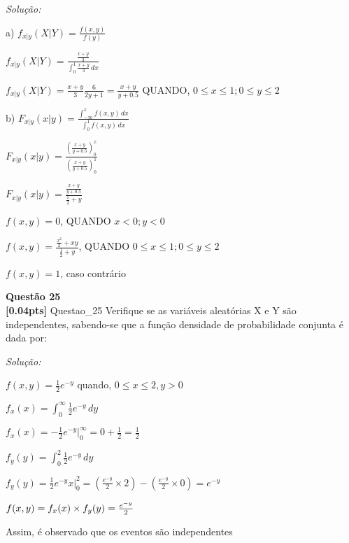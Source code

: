 \documentclass{article}
\newenvironment{problem}[2][Questão]
    { \begin{mdframed}[backgroundcolor=gray!20] \textbf{#1 #2} \\}
    {  \end{mdframed}}
\newenvironment{solution}
    {\textit{Solução:}}
    {}
\begin{document}
\begin{solution}

a) $f_{x|y}(X|Y) = \frac{f(x,y)}{f(y)}$

$f_{x|y}(X|Y) = \frac{\frac{x+y}{3}}{\int_{0}^{1}\frac{x+y}{3} \,dx}$

$f_{x|y}(X|Y) = \frac{x+y}{3} \frac{6}{2y+1} = \frac{x+y}{y+0.5}$ QUANDO, $0 \leq x \leq 1 ; 0 \leq y \leq 2$

b) $F_{x|y}(x|y) = \frac{\int_{-\infty}^{x}f(x,y) \, dx}{\int_{0}^{1} f(x,y) \, dx}$

$F_{x|y}(x|y) = \frac{(\frac{x+y}{y+0.5})_{0}^{x}}{(\frac{x+y}{y+0.5})_{0}^{1}} $

$F_{x|y}(x|y) = \frac{\frac{x+y}{y+0.5}}{\frac{1}{2}+y}$

$f(x,y) = 0 $, QUANDO $x<0;y<0$

$f(x,y) = \frac{\frac{x^{2}}{2}+xy}{\frac{1}{2}+y} 
$, QUANDO $0 \leq x \leq 1; 0 \leq y \leq 2$

$f(x,y) = 1 $, caso contrário

\end{solution}

\begin{problem}{25}
\textbf{[0.04pts]} Questao\_25 Verifique se as variáveis aleatórias X e Y são independentes, sabendo-se que a função densidade de probabilidade conjunta é dada por: 

\end{problem}

\begin{solution}

$f(x,y) = \frac{1}{2} e^{-y}$ quando, $0 \leq x \leq 2, y> 0$

$f_{x}(x) = \int_{0}^{\infty} \frac{1}{2} e^{-y} \, dy$

$f_{x}(x) = -\frac{1}{2} e^{-y}|_{0}^{\infty} = 0 + \frac{1}{2} = \frac{1}{2}$

$f_{y}(y) = \int_{0}^{2} \frac{1}{2} e^{-y} \, dy$

$f_{y}(y) = \frac{1}{2} e^{-y}x|_{0}^{2} = (\frac{e^{-y}}{2} \times 2) - (\frac{e^{-y}}{2} \times 0) = e^{-y}$

$f(x,y) = f_{x}(x) \times f_{y}(y) = \frac{e^{-y}}{2} \newline$

Assim, é observado que os eventos são independentes

\end{solution}
\end{document}

